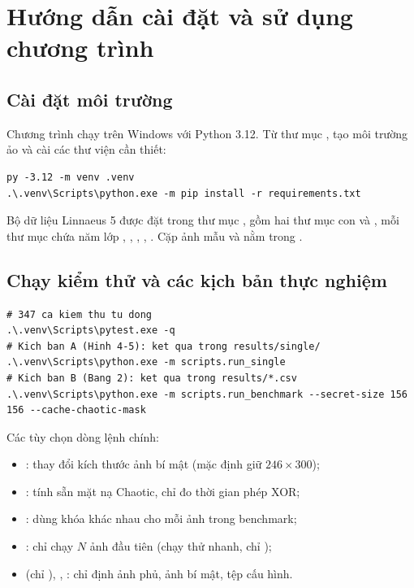 \chapter{Hướng dẫn cài đặt và sử dụng chương trình}
\label{app:huongdan}

\section{Cài đặt môi trường}

Chương trình chạy trên Windows với Python 3.12. Từ thư mục , tạo môi trường ảo và cài
các thư viện cần thiết:

\begin{lstlisting}[style=plain]
py -3.12 -m venv .venv
.\.venv\Scripts\python.exe -m pip install -r requirements.txt
\end{lstlisting}

Bộ dữ liệu Linnaeus 5 được đặt trong thư mục , gồm hai thư mục con
 và , mỗi thư mục chứa năm lớp , , ,
, . Cặp ảnh mẫu  và  nằm trong
.

\section{Chạy kiểm thử và các kịch bản thực nghiệm}

\begin{lstlisting}[style=plain]
# 347 ca kiem thu tu dong
.\.venv\Scripts\pytest.exe -q
# Kich ban A (Hinh 4-5): ket qua trong results/single/
.\.venv\Scripts\python.exe -m scripts.run_single
# Kich ban B (Bang 2): ket qua trong results/*.csv
.\.venv\Scripts\python.exe -m scripts.run_benchmark --secret-size 156 156 --cache-chaotic-mask
\end{lstlisting}

Các tùy chọn dòng lệnh chính:
\begin{itemize}
  \item {}: thay đổi kích thước ảnh bí mật (mặc định giữ $246\times300$);
  \item {}: tính sẵn mặt nạ Chaotic, chỉ đo thời gian phép XOR;
  \item {}: dùng khóa khác nhau cho mỗi ảnh trong benchmark;
  \item {}: chỉ chạy $N$ ảnh đầu tiên (chạy thử nhanh, chỉ );
  \item {} (chỉ ), , : chỉ định ảnh phủ,
        ảnh bí mật, tệp cấu hình.
\end{itemize}

